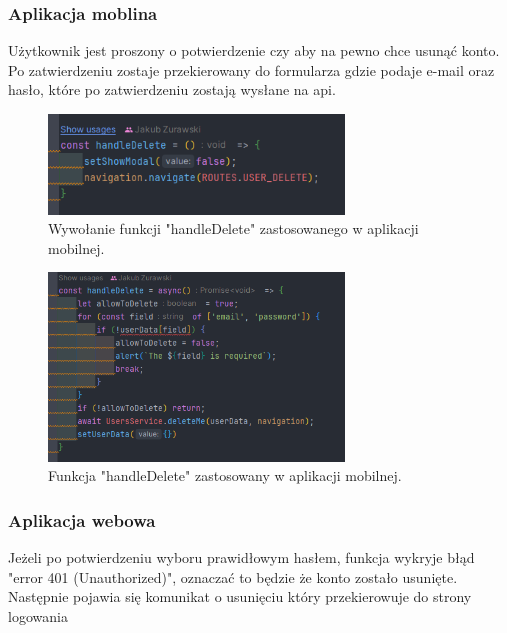 \subsubsection{Aplikacja moblina}
Użytkownik jest proszony o potwierdzenie czy aby na pewno chce usunąć konto. Po zatwierdzeniu zostaje przekierowany do formularza gdzie podaje e-mail oraz hasło, które po zatwierdzeniu zostają wysłane na api.

\begin{figure}[H]
    \centering
    \includegraphics[width=0.7\textwidth]{chapters/chapter_8/screens/delete_user_mobile_1}
    \caption{Wywołanie funkcji "handleDelete" zastosowanego w aplikacji mobilnej.}
    \label{img:delete_user_mobile_1}
\end{figure}

\begin{figure}[H]
    \centering
    \includegraphics[width=0.7\textwidth]{chapters/chapter_8/screens/delete_user_mobile_2}
    \caption{Funkcja "handleDelete" zastosowany w aplikacji mobilnej.}
    \label{img:delete_user_mobile_2}
\end{figure}

\subsubsection{Aplikacja webowa}

Jeżeli po potwierdzeniu wyboru prawidłowym hasłem, funkcja wykryje błąd "error 401 (Unauthorized)", oznaczać to będzie że konto zostało usunięte. Następnie pojawia się komunikat o usunięciu który przekierowuje do strony logowania

